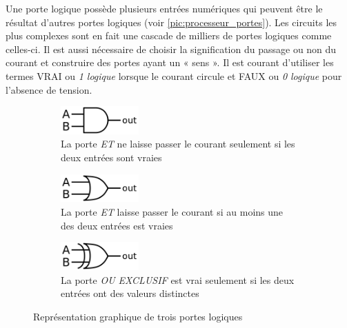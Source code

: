 Une porte logique possède plusieurs entrées numériques qui peuvent être le résultat d'autres portes logiques (voir \autoref{pic:processeur_portes}). Les circuits les plus complexes sont en fait une cascade de milliers de portes logiques comme celles-ci. Il est aussi nécessaire de choisir la signification du passage ou non du courant et construire des portes ayant un « sens ». Il est courant d’utiliser les termes VRAI ou \textit{1 logique} lorsque le courant circule et FAUX ou \textit{0 logique} pour l’absence de tension.


\begin{figure}
\begin{subfigure}{.3\textwidth}
\centering
\includegraphics[width=3cm]{images/processeur_porte_et.png}
\caption{La porte \textit{ET} ne laisse passer le courant seulement si les deux entrées sont vraies}
\end{subfigure}\hfill
\begin{subfigure}{.3\textwidth}
\centering
\includegraphics[width=3cm]{images/processeur_porte_ou.png}
\caption{La porte \textit{ET} laisse passer le courant si au moins une des deux entrées est vraies}
\end{subfigure}\hfill
\begin{subfigure}{.3\textwidth}
\centering
\includegraphics[width=3cm]{images/processeur_porte_oux.png}
\caption{La porte \textit{OU EXCLUSIF} est vrai seulement si les deux entrées ont des valeurs distinctes}
\end{subfigure}
\caption{Représentation graphique de trois portes logiques \cite{Wikipedia2019Porte}}
\label{pic:processeur_portes}
\end{figure}




